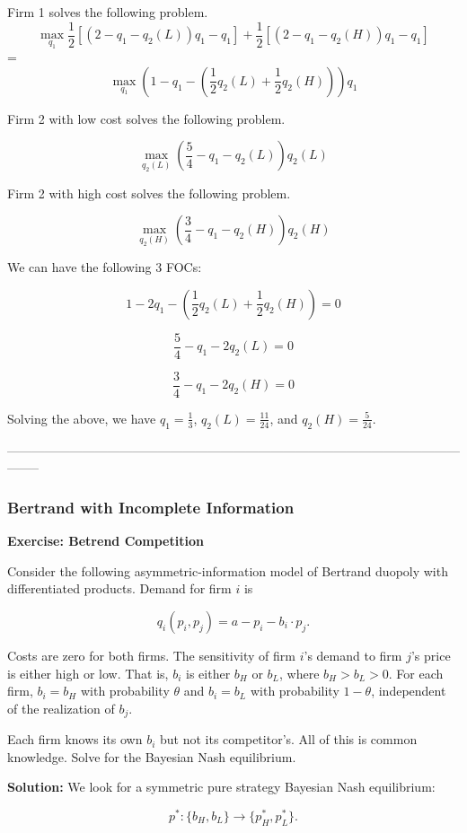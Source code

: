 \documentclass[12pt, oneside]{article}
\begin{document}
Firm 1 solves the following problem.
\[
\max_{q_1} \frac{1}{2} \left[ (2 - q_1 - q_2(L)) q_1 - q_1 \right] 
+ \frac{1}{2} \left[ (2 - q_1 - q_2(H)) q_1 - q_1 \right]
\] = \[
\max_{q_1} \left( 1 - q_1 - \left( \frac{1}{2} q_2(L) + \frac{1}{2} q_2(H) \right) \right) q_1
\]

Firm 2 with low cost solves the following problem.

\[
\max_{q_2(L)} \left( \frac{5}{4} - q_1 - q_2(L) \right) q_2(L)
\]

Firm 2 with high cost solves the following problem.

\[
\max_{q_2(H)} \left( \frac{3}{4} - q_1 - q_2(H) \right) q_2(H)
\]

We can have the following 3 FOCs:

\[
1 - 2q_1 - \left( \frac{1}{2} q_2(L) + \frac{1}{2} q_2(H) \right) = 0
\]

\[
\frac{5}{4} - q_1 - 2q_2(L) = 0
\]

\[
\frac{3}{4} - q_1 - 2q_2(H) = 0
\]

Solving the above, we have \( q_1 = \frac{1}{3} \), \( q_2(L) = \frac{11}{24} \), and \( q_2(H) = \frac{5}{24} \).

--------------------------------------------------------------------------------------------------------------------
\subsubsection{Bertrand with Incomplete Information}
\textbf{Exercise: Betrend Competition} 

Consider the following asymmetric-information model of Bertrand duopoly with differentiated products. Demand for firm \( i \) is 

\[
q_i(p_i, p_j) = a - p_i - b_i \cdot p_j.
\]

Costs are zero for both firms. The sensitivity of firm \( i \)'s demand to firm \( j \)'s price is either high or low. That is, \( b_i \) is either \( b_H \) or \( b_L \), where \( b_H > b_L > 0 \). For each firm, \( b_i = b_H \) with probability \( \theta \) and \( b_i = b_L \) with probability \( 1 - \theta \), independent of the realization of \( b_j \). 

Each firm knows its own \( b_i \) but not its competitor’s. All of this is common knowledge. Solve for the Bayesian Nash equilibrium.

\textbf{Solution:}
We look for a symmetric pure strategy Bayesian Nash equilibrium:

\[
p^*: \{b_H, b_L\} \to \{p^*_H, p^*_L\}.
\]
\end{document}

